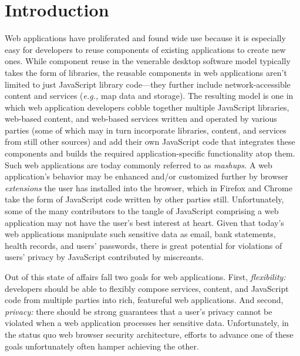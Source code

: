 \section{Introduction}
\label{sec:intro}

Web applications have proliferated and found wide use because it is
especially easy for developers to reuse components of existing
applications to create new ones. While component reuse in the
venerable desktop software model typically takes the form of
libraries, the reusable components in web applications aren't limited
to just JavaScript library code---they further include
network-accessible content and services ({\em e.g.,} map data and
storage). The resulting model is one in which web application
developers cobble together multiple JavaScript libraries, web-based
content, and web-based services written and operated by various
parties (some of which may in turn incorporate libraries, content, and
services from still other sources) and add their own JavaScript code
that integrates these components and builds the required
application-specific functionality atop them. Such web applications
are today commonly referred to as {\em mashups.} A web application's
behavior may be enhanced and/or customized further by browser {\em
  extensions} the user has installed into the browser, which in
Firefox and Chrome take the form of JavaScript code written by other
parties still. Unfortunately, some of the many contributors to the
tangle of JavaScript comprising a web application may not have the
user's best interest at heart. Given that today's web applications
manipulate such sensitive data as email, bank statements, health
records, and users' passwords, there is great potential for violations
of users' privacy by JavaScript contributed by miscreants.

Out of this state of affairs fall two goals for web
applications. First, {\em flexibility:} developers should be able to
flexibly compose services, content, and JavaScript code from multiple
parties into rich, featureful web applications. And second, {\em
  privacy:} there should be strong guarantees that a user's privacy
cannot be violated when a web application processes her sensitive
data. Unfortunately, in the status quo web browser security
architecture, efforts to advance one of these goals unfortunately
often hamper achieving the other.

